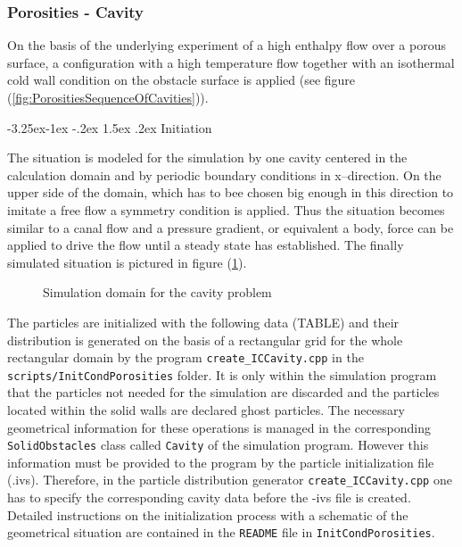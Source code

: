 \documentclass{report}
\makeatletter
\renewcommand\paragraph{\@startsection{paragraph}{4}{\z@}%
  {-3.25ex\@plus -1ex \@minus -.2ex}%
  {1.5ex \@plus .2ex}%
  {\normalfont\normalsize\bfseries}}
\makeatother
\begin{document}
\subsubsection{Porosities - Cavity}
On the basis of the underlying experiment of a high enthalpy flow over a porous surface, a configuration with a high temperature %
flow together with an isothermal cold wall condition on the obstacle surface is applied (see figure (\ref{fig:PorositiesSequenceOfCavities})).

\paragraph {Initiation}

The situation is modeled for the simulation by one cavity centered in the calculation domain and by periodic boundary conditions in x--direction. On the upper side of the domain, which has to bee chosen big enough in this direction to imitate a free flow a symmetry condition is applied. Thus the situation becomes similar to a canal flow and a pressure gradient, or equivalent a body, force can be applied to drive the flow until a steady state has established. The finally simulated situation is pictured in figure (\ref{fig:PorositiesCavitiesSimuDomain}).

\begin{figure}[!htbp]
  \centering
  \caption{Simulation domain for the cavity problem }
  \label{fig:PorositiesCavitiesSimuDomain}
\end{figure}

The particles are initialized with the following data (TABLE) and their distribution is generated on the basis of a rectangular grid for the whole rectangular domain by the program {\tt create\_ICCavity.cpp} in the {\tt scripts/InitCondPorosities} folder. It is only within the simulation program that the particles not needed for the simulation are discarded and the particles located within the solid walls are declared ghost particles. The necessary geometrical information for these operations is managed in the corresponding {\tt SolidObstacles} class called {\tt Cavity} of the simulation program.
However this information must be provided to the program by the particle initialization file (.ivs). Therefore, in the particle distribution generator {\tt create\_ICCavity.cpp} one has to specify the corresponding cavity data before the -ivs file is created. Detailed instructions on the initialization process with a schematic of the geometrical situation are contained in the {\tt README} file in {\tt InitCondPorosities}.
\end{document}
